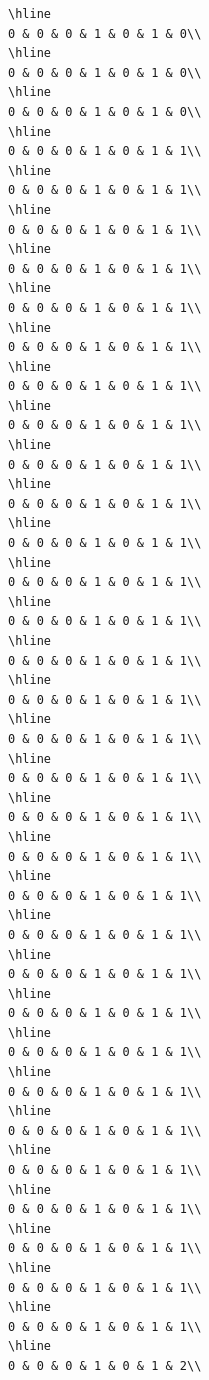 \documentclass[
]{article}
\begin{document}
\begin{verbatim}
\hline
0 & 0 & 0 & 1 & 0 & 1 & 0\\
\hline
0 & 0 & 0 & 1 & 0 & 1 & 0\\
\hline
0 & 0 & 0 & 1 & 0 & 1 & 0\\
\hline
0 & 0 & 0 & 1 & 0 & 1 & 1\\
\hline
0 & 0 & 0 & 1 & 0 & 1 & 1\\
\hline
0 & 0 & 0 & 1 & 0 & 1 & 1\\
\hline
0 & 0 & 0 & 1 & 0 & 1 & 1\\
\hline
0 & 0 & 0 & 1 & 0 & 1 & 1\\
\hline
0 & 0 & 0 & 1 & 0 & 1 & 1\\
\hline
0 & 0 & 0 & 1 & 0 & 1 & 1\\
\hline
0 & 0 & 0 & 1 & 0 & 1 & 1\\
\hline
0 & 0 & 0 & 1 & 0 & 1 & 1\\
\hline
0 & 0 & 0 & 1 & 0 & 1 & 1\\
\hline
0 & 0 & 0 & 1 & 0 & 1 & 1\\
\hline
0 & 0 & 0 & 1 & 0 & 1 & 1\\
\hline
0 & 0 & 0 & 1 & 0 & 1 & 1\\
\hline
0 & 0 & 0 & 1 & 0 & 1 & 1\\
\hline
0 & 0 & 0 & 1 & 0 & 1 & 1\\
\hline
0 & 0 & 0 & 1 & 0 & 1 & 1\\
\hline
0 & 0 & 0 & 1 & 0 & 1 & 1\\
\hline
0 & 0 & 0 & 1 & 0 & 1 & 1\\
\hline
0 & 0 & 0 & 1 & 0 & 1 & 1\\
\hline
0 & 0 & 0 & 1 & 0 & 1 & 1\\
\hline
0 & 0 & 0 & 1 & 0 & 1 & 1\\
\hline
0 & 0 & 0 & 1 & 0 & 1 & 1\\
\hline
0 & 0 & 0 & 1 & 0 & 1 & 1\\
\hline
0 & 0 & 0 & 1 & 0 & 1 & 1\\
\hline
0 & 0 & 0 & 1 & 0 & 1 & 1\\
\hline
0 & 0 & 0 & 1 & 0 & 1 & 1\\
\hline
0 & 0 & 0 & 1 & 0 & 1 & 1\\
\hline
0 & 0 & 0 & 1 & 0 & 1 & 1\\
\hline
0 & 0 & 0 & 1 & 0 & 1 & 1\\
\hline
0 & 0 & 0 & 1 & 0 & 1 & 1\\
\hline
0 & 0 & 0 & 1 & 0 & 1 & 1\\
\hline
0 & 0 & 0 & 1 & 0 & 1 & 2\\

\end{verbatim}
\end{document}
